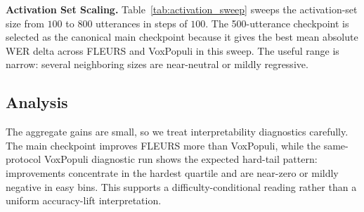 \documentclass[a4paper]{article}
\begin{document}
\textbf{Activation Set Scaling.}\quad
Table~\ref{tab:activation_sweep} sweeps the activation-set size from $100$ to $800$ utterances in steps of $100$. The 500-utterance checkpoint is selected as the canonical main checkpoint because it gives the best mean absolute WER delta across FLEURS and VoxPopuli in this sweep. The useful range is narrow: several neighboring sizes are near-neutral or mildly regressive.

\begin{table}[th]
  \caption{Activation set scaling sweep ($\theta{=}0.0$). $\Delta$ (pp) is the absolute WER change vs.\ the Baseline; \textbf{Mean $\Delta$ (pp)} averages the two benchmarks.}
  \label{tab:activation_sweep}
  \centering
\end{table}

\subsection{Analysis}
\label{sec:analysis}

The aggregate gains are small, so we treat interpretability diagnostics carefully. The main checkpoint improves FLEURS more than VoxPopuli, while the same-protocol VoxPopuli diagnostic run shows the expected hard-tail pattern: improvements concentrate in the hardest quartile and are near-zero or mildly negative in easy bins. This supports a difficulty-conditional reading rather than a uniform accuracy-lift interpretation.
\end{document}
